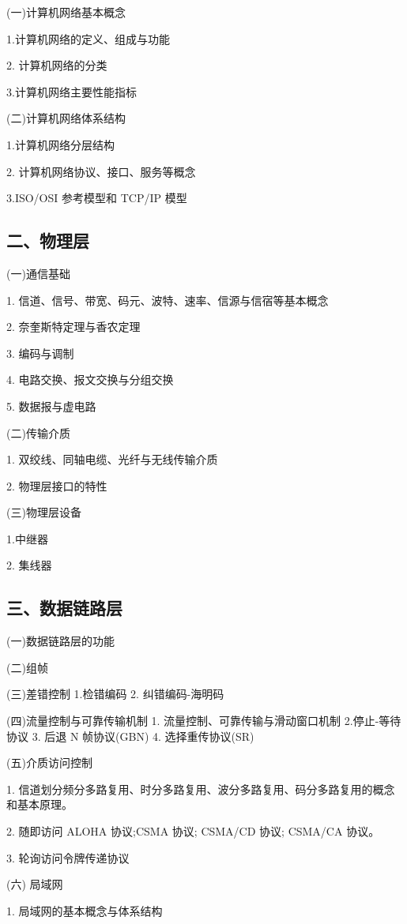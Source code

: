 \documentclass[10pt]{article}
\begin{document}
(一)计算机网络基本概念

1.计算机网络的定义、组成与功能

2. 计算机网络的分类

3.计算机网络主要性能指标

(二)计算机网络体系结构

1.计算机网络分层结构

2. 计算机网络协议、接口、服务等概念

3.ISO/OSI 参考模型和 TCP/IP 模型

\subsection*{二、物理层}

(一)通信基础

1. 信道、信号、带宽、码元、波特、速率、信源与信宿等基本概念

2. 奈奎斯特定理与香农定理

3. 编码与调制

4. 电路交换、报文交换与分组交换

5. 数据报与虚电路

(二)传输介质

1. 双绞线、同轴电缆、光纤与无线传输介质 

2. {\color{red} 物理层接口的特性}

(三)物理层设备

1.中继器 

2. 集线器

\subsection*{三、数据链路层}

(一)数据链路层的功能

(二)组帧 

(三)差错控制 1.检错编码 2.{\color{red} 纠错编码-海明码}

(四)流量控制与可靠传输机制 1. 流量控制、可靠传输与滑动窗口机制 2.停止-等待协议 3. 后退 N 帧协议(GBN) 4. 选择重传协议(SR)

(五)介质访问控制 

1. {\color{red}信道划分频分多路复用、时分多路复用、波分多路复用、码分多路复用的概念和基本原理}。 

2. {\color{red} 随即访问 ALOHA 协议;CSMA 协议;} CSMA/CD 协议; CSMA/CA 协议。 

3. 轮询访问令牌传递协议

(六) 局域网

1. 局域网的基本概念与体系结构
\end{document}
